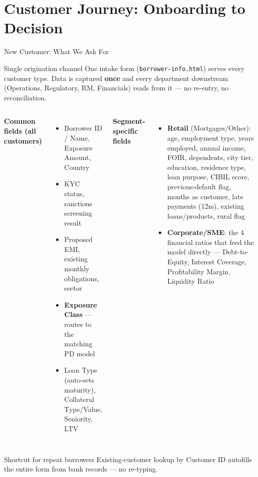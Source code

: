 \documentclass[9pt,aspectratio=169]{beamer}
\begin{document}
\section{Customer Journey: Onboarding to Decision}

\begin{frame}{New Customer: What We Ask For}
\vspace{-2pt}
\begin{block}{Single origination channel}
  \footnotesize
  One intake form (\texttt{borrower-info.html}) serves every customer type. Data is captured
  \textbf{once} and every department downstream (Operations, Regulatory, RM, Financials) reads
  from it --- no re-entry, no reconciliation.
\end{block}
\vspace{6pt}
\begin{columns}[T]
    \footnotesize\textbf{Common fields (all customers)}
    \begin{itemize}\setlength\itemsep{2pt}\footnotesize
      \item[\small$\bullet$] Borrower ID / Name, Exposure Amount, Country
      \item[\small$\bullet$] KYC status, sanctions screening result
      \item[\small$\bullet$] Proposed EMI, existing monthly obligations, sector
      \item[\small$\bullet$] \textbf{Exposure Class} --- routes to the matching PD model
      \item[\small$\bullet$] Loan Type (auto-sets maturity), Collateral Type/Value, Seniority, LTV
    \end{itemize}
    \footnotesize\textbf{Segment-specific fields}
    \begin{itemize}\setlength\itemsep{2pt}\footnotesize
      \item[\small$\bullet$] \textbf{Retail} (Mortgages/Other): age, employment type, years
            employed, annual income, FOIR, dependents, city tier, education, residence type,
            loan purpose, CIBIL score, previous-default flag, months as customer, late payments
            (12m), existing loans/products, rural flag
      \item[\small$\bullet$] \textbf{Corporate/SME}: the 4 financial ratios that feed the model
            directly --- Debt-to-Equity, Interest Coverage, Profitability Margin, Liquidity Ratio
    \end{itemize}
\end{columns}
\vspace{8pt}
\begin{alertblock}{Shortcut for repeat borrowers}
  \footnotesize
  Existing-customer lookup by Customer ID autofills the entire form from bank records ---
  no re-typing.
\end{alertblock}
\end{frame}
\end{document}
